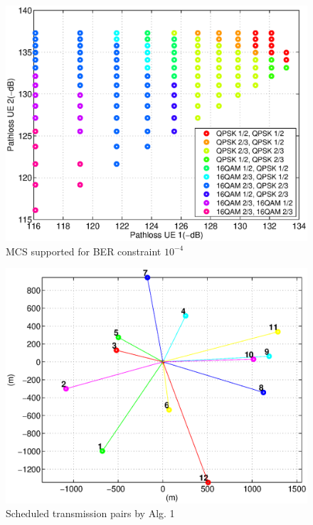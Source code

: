 \begin{figure}[t]
\begin{center}
\includegraphics[width=0.9\columnwidth ,angle=0]{figure/pair_mcs.eps}
\caption{MCS supported for BER constraint $10^{-4}$}
\label{fig_pair_mcs}
\end{center}
\end{figure}

\begin{figure}[t]
\begin{center}
\includegraphics[width=0.9\columnwidth ,angle=0]{figure/my_schedule.eps}
\caption{Scheduled transmission pairs by Alg. 1}
\label{fig_my_schedule}
\end{center}
\end{figure}


